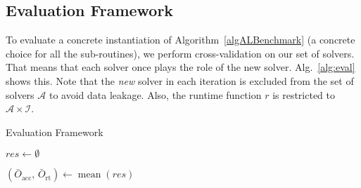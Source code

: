 \documentclass[runningheads]{llncs}
\begin{document}
\subsection{Evaluation Framework}
\label{sec:evalframe}
To evaluate a concrete instantiation of Algorithm~\ref{algALBenchmark} (a concrete choice for all the sub-routines), we perform cross-validation on our set of solvers.
That means that each solver once plays the role of the new solver.
Alg.~\ref{alg:eval} shows this.
Note that the \emph{new} solver in each iteration is excluded from the set of solvers $\mathcal{A}$ to avoid data leakage.
Also, the runtime function $r$ is restricted to $\mathcal{A} \times \mathcal{I}$.

\vspace{-0.2cm}
\begin{algorithm}[htbp]
  \caption{Evaluation Framework}
  \label{alg:eval}


  $res \leftarrow \emptyset$


  $\left( \bar{O}_{\operatorname{acc}},\, \bar{O}_{\operatorname{rt}} \right) \leftarrow \operatorname{mean}\!\left( res \right)$

\end{algorithm}
\vspace{-0.2cm}
\end{document}
